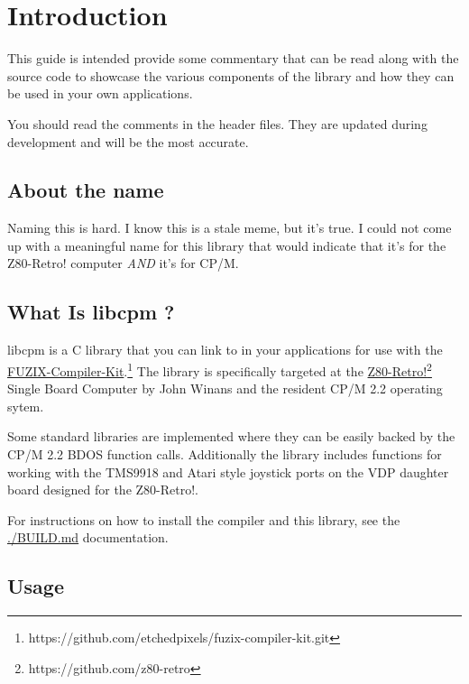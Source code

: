 \documentclass[10pt,a4paper,hidelinks]{article}
\title{\lib}
\author{David Latham}
\date{September, 2025}
\def\lib{libcpm }
\begin{document}
\maketitle
\tableofcontents
\pagebreak
\section{Introduction}

This guide is intended provide some commentary that can be read along with the
source code to showcase the various components of the library and how they can
be used in your own applications.

You should read the comments in the header files.  They are updated during
development and will be the most accurate.

\subsection{About the name}

Naming this is hard.  I know this is a stale meme, but it's true.  I could not
come up with a meaningful name for this library that would indicate that it's
for the Z80-Retro! computer \emph{AND} it's for CP/M.

\subsection{What Is \lib?}

\lib is a C library that you can link to in your applications for
use with the
\href{https://github.com/etchedpixels/fuzix-compiler-kit.git}{FUZIX-Compiler-Kit}.\footnote{https://github.com/etchedpixels/fuzix-compiler-kit.git}
The library is specifically targeted at the
\href{https://github.com/z80-retro}{Z80-Retro!}\footnote{https://github.com/z80-retro} Single Board Computer by John
Winans and the resident CP/M 2.2 operating sytem.

Some standard libraries are implemented where they can be easily backed by the
CP/M 2.2 BDOS function calls.  Additionally the library includes functions for
working with the TMS9918 and Atari style joystick ports on the VDP daughter
board designed for the Z80-Retro!.

For instructions on how to install the compiler and this library, see the
\url{./BUILD.md} documentation.

\subsection{Usage}
\end{document}
